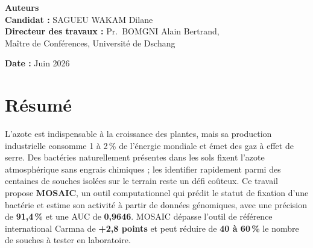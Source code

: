\documentclass[14pt,a4paper]{extarticle}
\begin{document}
\vspace{2.5em}

\begin{center}
\end{center}

\vspace{3em}

\begin{center}
{\fontsize{15pt}{18pt}\selectfont\bfseries Auteurs}\\[1em]
{\fontsize{12pt}{14pt}\selectfont
\textbf{Candidat :} SAGUEU WAKAM Dilane\\[0.5em]
\textbf{Directeur des travaux :} Pr.~BOMGNI Alain Bertrand,\\
Maître de Conférences, Université de Dschang}
\end{center}

\vfill

\begin{center}
{\fontsize{12pt}{14pt}\selectfont\textbf{Date :} Juin 2026}
\end{center}

\endgroup
\newpage


\section*{Résumé}
L'azote est indispensable à la croissance des plantes, mais sa production industrielle consomme 1 à 2\,\% de l'énergie mondiale et émet des gaz à effet de serre. Des bactéries naturellement présentes dans les sols fixent l'azote atmosphérique sans engrais chimiques ; les identifier rapidement parmi des centaines de souches isolées sur le terrain reste un défi coûteux. Ce travail propose \textbf{MOSAIC}, un outil computationnel qui prédit le statut de fixation d'une bactérie et estime son activité à partir de données génomiques, avec une précision de \textbf{91,4\,\%} et une AUC de \textbf{0,9646}. MOSAIC dépasse l'outil de référence international Carmna de \textbf{+2,8 points} et peut réduire de \textbf{40 à 60\,\%} le nombre de souches à tester en laboratoire.
\end{document}
